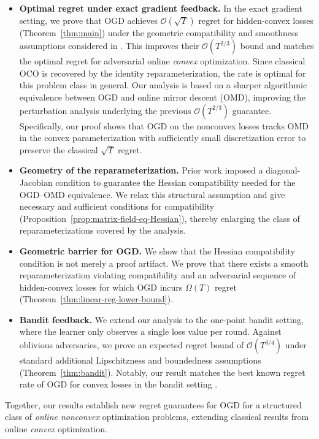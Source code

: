 \documentclass[a4paper,11pt,fullpage]{article}
\theoremstyle{plain}
\theoremstyle{definition}
\theoremstyle{plain}
\begin{document}
\begin{itemize}[leftmargin=*]
    \item \textbf{Optimal regret under exact gradient feedback.}
    In the exact gradient setting, we prove that OGD achieves $\mathcal{O}(\sqrt{T})$ regret for hidden-convex losses (Theorem~\ref{thm:main}) under the geometric compatibility and smoothness assumptions considered in \citet{ghai-lu-hazan22}. 
    This improves their $\mathcal{O}(T^{2/3})$ bound and matches the optimal regret for adversarial online \textit{convex} optimization. 
    Since classical OCO is recovered by the identity reparameterization, the rate is optimal for this problem class in general. Our analysis is based on a sharper algorithmic equivalence between OGD and online mirror descent (OMD), improving the perturbation analysis underlying the previous $\mathcal{O}(T^{2/3})$ guarantee. Specifically, our proof shows that OGD on the nonconvex losses tracks OMD in the convex parameterization with sufficiently small discretization error to preserve the classical $\sqrt{T}$ regret. 

    \item \textbf{Geometry of the reparameterization.} 
    Prior work \citep{ghai-lu-hazan22} imposed a diagonal-Jacobian condition to guarantee the Hessian compatibility needed for the OGD–OMD equivalence. We relax this structural assumption and give necessary and sufficient conditions for compatibility (Proposition~\ref{prop:matrix-field-eq-Hessian}), thereby enlarging the class of reparameterizations covered by the analysis.

    \item \textbf{Geometric barrier for OGD.}
    We show that the Hessian compatibility condition is not merely a proof artifact. 
    We prove that there exists a smooth reparameterization violating compatibility and an adversarial sequence of hidden-convex losses for which OGD incurs $\Omega(T)$ regret (Theorem~\ref{thm:linear-reg-lower-bound}).

    \item \textbf{Bandit feedback.}
    We extend our analysis to the one-point bandit setting, where the learner only observes a single loss value per round. 
    Against oblivious adversaries, we prove an expected regret bound of 
    $\mathcal{O}(T^{3/4})$ under standard additional Lipschitzness and boundedness assumptions (Theorem~\ref{thm:bandit}). 
    Notably, our result matches the best known regret rate of OGD for convex losses in the bandit setting \citep{flaxman-kalai-mcmahan05}.
\end{itemize}
Together, our results establish new regret guarantees for OGD for a structured class of \textit{online nonconvex} optimization problems, extending classical results from online \textit{convex} optimization. 
\end{document}

